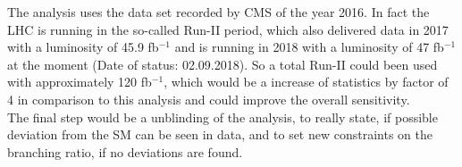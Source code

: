 The analysis uses the data set recorded by \gls{CMS} of the year 2016. In fact the \gls{LHC} is running in the so-called Run-II period, which also delivered data in 2017 with a luminosity of 45.9 fb$^{-1}$ and is running in 2018 with a luminosity of 47 fb$^{-1}$ at the moment \cite{CMSLUMI1718} (Date of status: 02.09.2018). So a total Run-II could been used with approximately 120 fb$^{-1}$, which would be a increase of statistics by factor of 4 in comparison to this analysis and could improve the overall sensitivity. \\

The final step would be a unblinding of the analysis, to really state, if possible deviation from the \gls{SM} can be seen in data, and to set new constraints on the branching ratio, if no deviations are found. 



 



  




